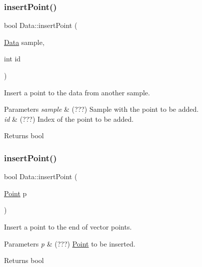 \subsubsection{\texorpdfstring{insert\+Point()}{insertPoint()}\hspace{0.1cm}{\footnotesize\ttfamily [1/2]}}
{\footnotesize\ttfamily bool Data\+::insert\+Point (\begin{DoxyParamCaption}\item[{\hyperlink{class_data}{Data}}]{sample,  }\item[{int}]{id }\end{DoxyParamCaption})}



Insert a point to the data from another sample. 


\begin{DoxyParams}{Parameters}
{\em sample} & (???) Sample with the point to be added. \\
\hline
{\em id} & (???) Index of the point to be added. \\
\hline
\end{DoxyParams}
\begin{DoxyReturn}{Returns}
bool 
\end{DoxyReturn}
\mbox{\label{class_data_a4694df7867fa112b219bbf6ed17880e9}} 
\subsubsection{\texorpdfstring{insert\+Point()}{insertPoint()}\hspace{0.1cm}{\footnotesize\ttfamily [2/2]}}
{\footnotesize\ttfamily bool Data\+::insert\+Point (\begin{DoxyParamCaption}\item[{\hyperlink{class_point}{Point}}]{p }\end{DoxyParamCaption})}



Insert a point to the end of vector points. 


\begin{DoxyParams}{Parameters}
{\em p} & (???) \hyperlink{class_point}{Point} to be inserted. \\
\hline
\end{DoxyParams}
\begin{DoxyReturn}{Returns}
bool 
\end{DoxyReturn}
\mbox{\label{class_data_a93468d3b8b2ce0f73e369e5de160534e}} 
